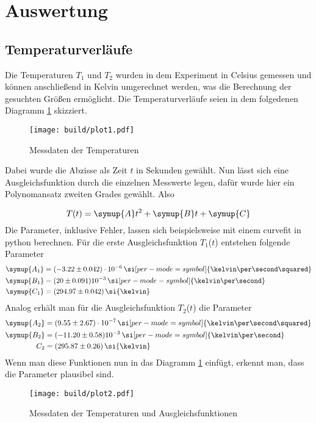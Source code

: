 \section{Auswertung}
\subsection{Temperaturverläufe}
Die Temperaturen $T_{1}$ und $T_{2}$ wurden in dem Experiment in Celsius gemessen und können anschließend in Kelvin umgerechnet werden, was die Berechnung
der gesuchten Größen ermöglicht. Die Temperaturverläufe seien in dem folgedenen Diagramm \ref{fig:plot1} skizziert.
\begin{figure}[h]
  \centering
  \texttt{[image: build/plot1.pdf]}
  \caption{Messdaten der Temperaturen}
  \label{fig:plot1}
\end{figure}
\begin{flushleft}
Dabei wurde die Abzisse als Zeit $t$ in Sekunden gewählt. Nun lässt sich eine Ausgleichsfunktion durch
die einzelnen Messwerte legen, dafür wurde hier ein Polynomansatz zweiten Grades gewählt. Also
\end{flushleft}
\begin{equation}
T(t) = \symup{A} t^{2} + \symup{B} t + \symup{C}
\end{equation}
Die Parameter, inklusive Fehler, lassen sich beispielsweise mit einem curvefit in python berechnen.
Für die erste Ausgleichsfunktion $T_{1}$($t$) entstehen folgende Parameter
\begin{align}
\symup{A_{1}} &= (-3.22 \pm 0.042)\cdot 10^{-6} \, \si[per-mode=symbol]{\kelvin\per\second\squared}\\
\symup{B_{1}} &= (20 \pm 0.091) 10^{-3} \,\si[per-mode=symbol]{\kelvin\per\second}\\
\symup{C_{1}} &= (294.97 \pm 0.042) \,\si{\kelvin}
\end{align}
Analog erhält man für die Ausgleichsfunktion $T_{2}$($t$) die Parameter
\begin{align}
\symup{A_{2}} &= (9.55 \pm 2.67)\cdot 10^{-7} \, \si[per-mode=symbol]{\kelvin\per\second\squared}\\
\symup{B_{2}} &= (-11.20 \pm 0.58) 10^{-3} \,\si[per-mode=symbol]{\kelvin\per\second}\\
C_{2} &= (295.87 \pm 0.26) \,\si{\kelvin}
\end{align}
Wenn man diese Funktionen nun in das Diagramm \ref{fig:plot1} einfügt, erkennt man,
dass die Parameter plausibel sind.
\begin{figure}[h]
  \centering
  \texttt{[image: build/plot2.pdf]}
  \caption{Messdaten der Temperaturen und Ausgleichsfunktionen}
  \label{fig:plot2}
\end{figure}
